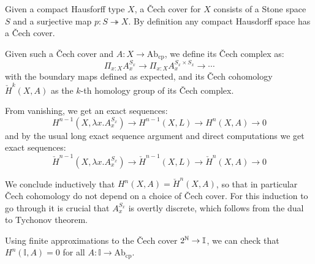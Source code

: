 \documentclass{../util/zariski}
\begin{document}
Given a compact Hausforff type $X$, a \v{C}ech cover for $X$ consists of a Stone space $S$ and a surjective map $p:S\twoheadrightarrow X$. By definition any compact Hausdorff space has a \v{C}ech cover.

Given such a \v{C}ech cover and $A:X\to \mathrm{Ab}_{\mathrm{cp}}$, we define its \v{C}ech complex as:
\[\Pi_{x:X}A_x^{S_x} \to \Pi_{x:X}A_x^{S_x\times S_x} \to \cdots\]
with the boundary maps defined as expected, and its \v{C}ech cohomology $\check{H}^k(X,A)$ as the $k$-th homology group of its \v{C}ech complex.

From vanishing, we get an exact sequences:
\[H^{n-1}(X,\lambda x.A_x^{S_x}) \to H^{n-1}(X,L)\to H^n(X,A)\to 0\]
and by the usual long exact sequence argument and direct computations we get exact sequences:
\[\check{H}^{n-1}(X,\lambda x.A_x^{S_x}) \to \check{H}^{n-1}(X,L)\to \check{H}^n(X,A)\to 0\]

We conclude inductively that $H^n(X,A) = \check{H}^n(X,A)$, so that in particular \v{C}ech cohomology do not depend on a choice of \v{C}ech cover. For this induction to go through it is crucial that $A_x^{S_x}$ is overtly discrete, which follows from the dual to Tychonov theorem.

Using finite approximations to the \v{C}ech cover $2^{\mathbb{N}}\to \mathbb{I}$, we can check that $H^n(\mathbb{I},A) = 0$ for all $A:\mathbb{I}\to \mathrm{Ab}_{\mathrm{cp}}$.

\printbibliography
\end{document}
